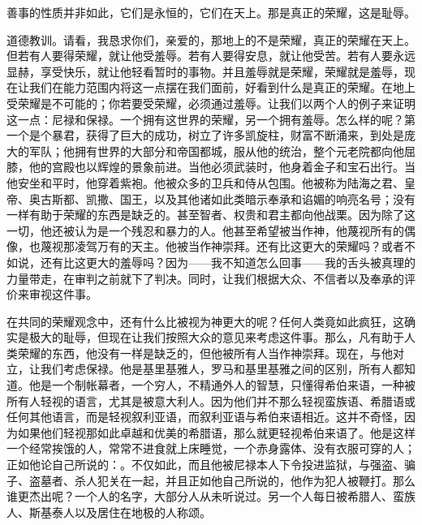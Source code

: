 善事的性质并非如此，它们是永恒的，它们在天上。那是真正的荣耀，这是耻辱。\par

道德教训。请看，我恳求你们，亲爱的，那地上的不是荣耀，真正的荣耀在天上。但若有人要得荣耀，就让他受羞辱。若有人要得安息，就让他受苦。若有人要永远显赫，享受快乐，就让他轻看暂时的事物。并且羞辱就是荣耀，荣耀就是羞辱，现在让我们在能力范围内将这一点摆在我们面前，好看到什么是真正的荣耀。在地上受荣耀是不可能的；你若要受荣耀，必须通过羞辱。让我们以两个人的例子来证明这一点：尼禄和保禄。一个拥有这世界的荣耀，另一个拥有羞辱。怎么样的呢？第一个是个暴君，获得了巨大的成功，树立了许多凯旋柱，财富不断涌来，到处是庞大的军队；他拥有世界的大部分和帝国都城，服从他的统治，整个元老院都向他屈膝，他的宫殿也以辉煌的景象前进。当他必须武装时，他身着金子和宝石出行。当他安坐和平时，他穿着紫袍。他被众多的卫兵和侍从包围。他被称为陆海之君、皇帝、奥古斯都、凯撒、国王，以及其他诸如此类暗示奉承和谄媚的响亮名号；没有一样有助于荣耀的东西是缺乏的。甚至智者、权贵和君主都向他战栗。因为除了这一切，他还被认为是一个残忍和暴力的人。他甚至希望被当作神，他蔑视所有的偶像，也蔑视那凌驾万有的天主。他被当作神崇拜。还有比这更大的荣耀吗？或者不如说，还有比这更大的羞辱吗？因为——我不知道怎么回事——我的舌头被真理的力量带走，在审判之前就下了判决。同时，让我们根据大众、不信者以及奉承的评价来审视这件事。\par

在共同的荣耀观念中，还有什么比被视为神更大的呢？任何人类竟如此疯狂，这确实是极大的耻辱，但现在让我们按照大众的意见来考虑这件事。那么，凡有助于人类荣耀的东西，他没有一样是缺乏的，但他被所有人当作神崇拜。现在，与他对立，让我们考虑保禄。他是基里基雅人，罗马和基里基雅之间的区别，所有人都知道。他是一个制帐幕者，一个穷人，不精通外人的智慧，只懂得希伯来语，一种被所有人轻视的语言，尤其是被意大利人。因为他们并不那么轻视蛮族语、希腊语或任何其他语言，而是轻视叙利亚语，而叙利亚语与希伯来语相近。这并不奇怪，因为如果他们轻视那如此卓越和优美的希腊语，那么就更轻视希伯来语了。他是这样一个经常挨饿的人，常常不进食就上床睡觉，一个赤身露体、没有衣服可穿的人；正如他论自己所说的：。不仅如此，而且他被尼禄本人下令投进监狱，与强盗、骗子、盗墓者、杀人犯关在一起，并且正如他自己所说的，他作为犯人被鞭打。那么谁更杰出呢？一个人的名字，大部分人从未听说过。另一个人每日被希腊人、蛮族人、斯基泰人以及居住在地极的人称颂。\par

